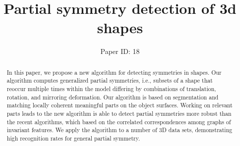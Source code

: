 \documentclass[twocolumn]{svjour3}          %
\begin{document}
\title{Partial symmetry detection of 3d shapes}
\subtitle{}
\author{Paper ID: 18}
\institute{}
\date{ }%

\maketitle

\begin{abstract}
In this paper, we propose a new algorithm for detecting symmetries in shapes.
Our algorithm computes generalized partial symmetries, i.e.,
subsets of a shape that reoccur multiple times within the model differing by combinations of translation, rotation, and mirroring deformation.
Our algorithm is based on segmentation and matching locally coherent meaningful parts on the object surfaces.
Working on relevant parts leads to the new algorithm is able to detect partial symmetries more robust than the recent algorithms,
which based on the correlated correspondences among graphs of invariant features.
We apply the algorithm to a number of 3D data sets, demonstrating high recognition rates for general partial symmetry.

\end{abstract}









\end{document}
